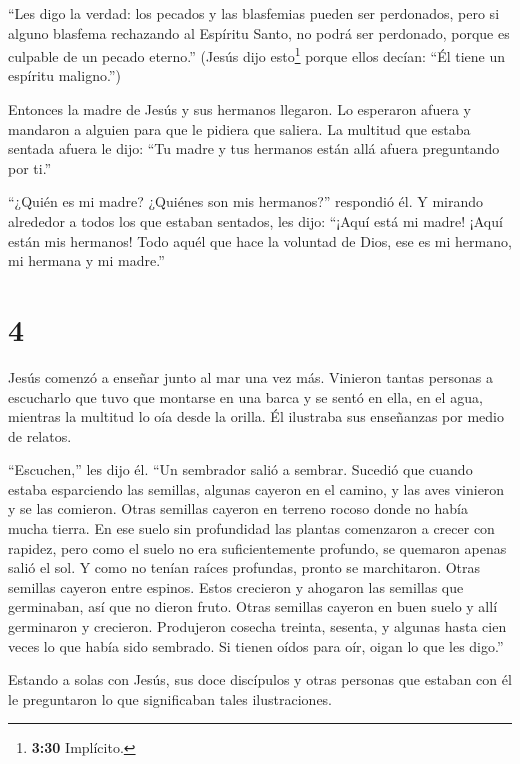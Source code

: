  ``Les digo la verdad: los pecados y las blasfemias pueden
ser perdonados,  pero si alguno blasfema rechazando al
Espíritu Santo, no podrá ser perdonado, porque es culpable de un pecado
eterno.''  (Jesús dijo esto\footnote{\textbf{3:30}
  Implícito.} porque ellos decían: ``Él tiene un espíritu maligno.'')

 Entonces la madre de Jesús y sus hermanos llegaron. Lo
esperaron afuera y mandaron a alguien para que le pidiera que saliera.
 La multitud que estaba sentada afuera le dijo: ``Tu madre
y tus hermanos están allá afuera preguntando por ti.''

 ``¿Quién es mi madre? ¿Quiénes son mis hermanos?''
respondió él.  Y mirando alrededor a todos los que estaban
sentados, les dijo: ``¡Aquí está mi madre! ¡Aquí están mis hermanos!
 Todo aquél que hace la voluntad de Dios, ese es mi
hermano, mi hermana y mi madre.''

\hypertarget{section-3}{%
\section{4}\label{section-3}}

 Jesús comenzó a enseñar junto al mar una vez más. Vinieron
tantas personas a escucharlo que tuvo que montarse en una barca y se
sentó en ella, en el agua, mientras la multitud lo oía desde la orilla.
 Él ilustraba sus enseñanzas por medio de relatos.

 ``Escuchen,'' les dijo él. ``Un sembrador salió a sembrar.
 Sucedió que cuando estaba esparciendo las semillas, algunas
cayeron en el camino, y las aves vinieron y se las comieron.
 Otras semillas cayeron en terreno rocoso donde no había
mucha tierra. En ese suelo sin profundidad las plantas comenzaron a
crecer con rapidez, pero como el suelo no era suficientemente profundo,
 se quemaron apenas salió el sol. Y como no tenían raíces
profundas, pronto se marchitaron.  Otras semillas cayeron
entre espinos. Estos crecieron y ahogaron las semillas que germinaban,
así que no dieron fruto.  Otras semillas cayeron en buen
suelo y allí germinaron y crecieron. Produjeron cosecha treinta,
sesenta, y algunas hasta cien veces lo que había sido sembrado.
 Si tienen oídos para oír, oigan lo que les digo.''

 Estando a solas con Jesús, sus doce discípulos y otras
personas que estaban con él le preguntaron lo que significaban tales
ilustraciones.

